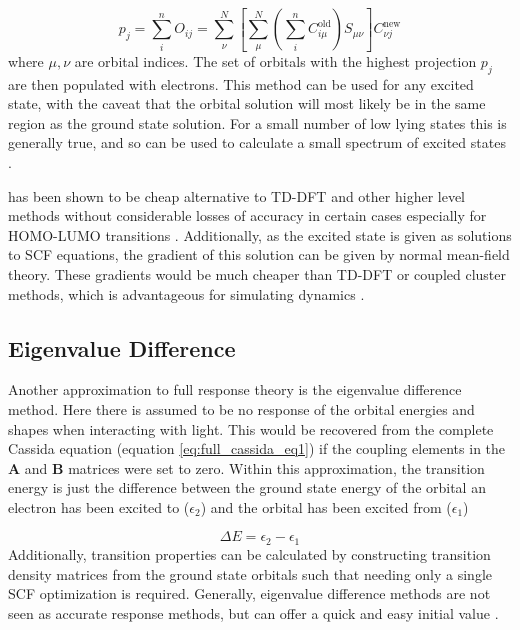 \begin{equation}
p_j = \sum^n_i O_{ij} = \sum^N_\nu \left[\sum^N_\mu\left(\sum^n_i C_{i\mu}^{\text{old}}\right)S_{\mu\nu}\right]C^{\text{new}}_{\nu j}
\end{equation}
%
where $\mu,\nu$ are orbital indices. The set of orbitals with the highest projection
$p_j$ are then populated with electrons.  This method can be used for any
excited state, with the caveat that the orbital solution will most likely be in
the same region as the ground state solution. For a small number of low lying states
this is generally true, and so \dscf can be used to calculate a small spectrum of
excited states \cite{Gilbert2008}.

\dscf has been shown to be cheap alternative to TD-DFT and other higher level methods 
\cite{Liu2004, Gavnholt2008, Besley2009} without considerable losses of accuracy 
in certain cases especially for HOMO-LUMO transitions \cite{Kowalczyk2011}. Additionally,
as the excited state is given as solutions to SCF equations, the gradient of this
solution can be given by normal mean-field theory. These gradients would be much
cheaper than TD-DFT or coupled cluster methods, which is advantageous for simulating
dynamics \cite{Gavnholt2008}.

\subsection{Eigenvalue Difference}
\label{subsec:eigval_diff}
Another approximation to full response theory is the eigenvalue difference method. 
Here there is assumed to be no response of the orbital energies and shapes when 
interacting with light. This would be recovered from the complete Cassida equation 
(equation \ref{eq:full_cassida_eq1}) if the coupling elements in the $\mathbf{A}$ 
and $\mathbf{B}$ matrices were set to zero. Within this approximation, the transition
energy is just the difference between the ground state energy of the orbital an 
electron has been excited to ($\epsilon_{\text{2}}$) and the orbital has been excited
from ($\epsilon_{\text{1}}$)

\begin{equation}
\Delta E = \epsilon_{\text{2}} - \epsilon_{\text{1}}
\end{equation}
%
Additionally, transition properties can be calculated by constructing transition 
density matrices from the ground state orbitals such that needing only a single 
SCF optimization is required. Generally, eigenvalue difference methods are not 
seen as accurate response methods, but can offer a quick and easy initial value 
\cite{Gimon2009}.

